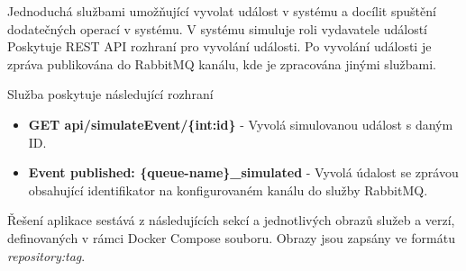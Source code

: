 
Jednoduchá službami umožňující vyvolat událost v systému a docílit spuštění dodatečných operací v systému. V systému simuluje roli vydavatele událostí Poskytuje REST API rozhraní pro vyvolání události. Po vyvolání události je zpráva publikována do RabbitMQ kanálu, kde je zpracována jinými službami.

Služba poskytuje následující rozhraní

\begin{itemize}
    \item \textbf{GET api/simulateEvent/\{int:id\}} - Vyvolá simulovanou událost s daným ID.
    \item \textbf{Event published: \{queue-name\}\_simulated} - Vyvolá údalost se zprávou obsahující identifikator na konfigurovaném kanálu do služby RabbitMQ.
\end{itemize}


Řešení aplikace sestává z následujících sekcí a jednotlivých obrazů služeb a verzí, definovaných v rámci Docker Compose souboru. Obrazy jsou zapsány ve formátu \emph{repository:tag}.

